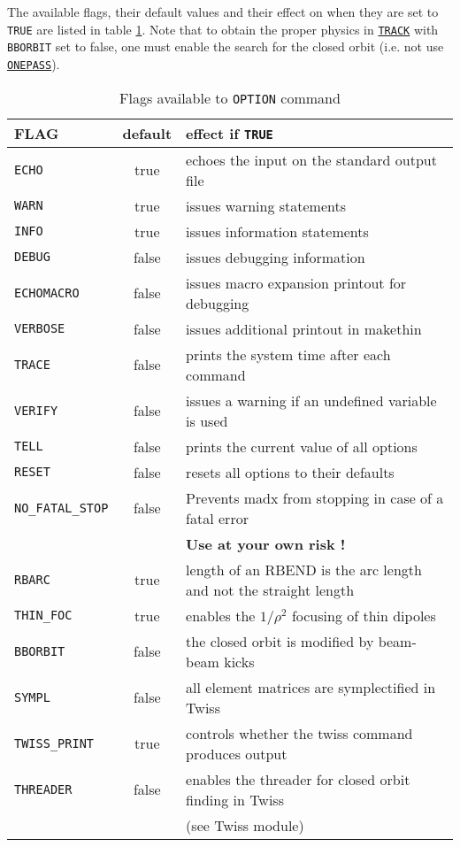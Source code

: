 The available flags, their default values and their effect on \madx when
they are set to \texttt{TRUE} are listed in table \ref{table:options}. Note that to obtain the proper physics in \hyperref[sec:track]{\texttt{TRACK}} with \texttt{BBORBIT} set to false, one must enable the search for the closed orbit (i.e. not use \hyperref[sec:track]{\texttt{ONEPASS}}).

\begin{table}[ht]
  \caption{Flags available to \texttt{OPTION} command}
  \vspace{1ex}
  \centering
  \label{table:options}
  \begin{tabular}{|l|c|l|}
    \hline
    \textbf{FLAG }  & \textbf{default} & \textbf{effect if \texttt{TRUE}} \\
    \hline
    \texttt{ECHO}      & true  & echoes the input on the standard output file \\
    \texttt{WARN}      & true  & issues warning statements\\
    \texttt{INFO}      & true  & issues information statements\\
    \texttt{DEBUG}     & false & issues debugging information \\
    \texttt{ECHOMACRO} & false & issues macro expansion printout for debugging \\
    \texttt{VERBOSE}   & false & issues additional printout in makethin \\
    \texttt{TRACE}     & false & prints the system time after each command \\
    \texttt{VERIFY}    & false & issues a warning if an undefined variable is used 
    \\
    \hline
    \texttt{TELL}      & false & prints the current value of all options \\
    \texttt{RESET}     & false & resets all options to their defaults \\
    \hline
    \texttt{NO\_FATAL\_STOP} & false & Prevents madx from stopping in case of a fatal error \\
    &       & \textbf{Use at your own risk !} \\
    \hline
    \texttt{RBARC}     & true & length of an RBEND is the arc length and not the straight length \\
    \texttt{THIN\_FOC} & true & enables the $1/\rho^2$ focusing of thin dipoles \\
    \texttt{BBORBIT}   & false & the closed orbit is modified by beam-beam kicks \\
    \texttt{SYMPL}     & false & all element matrices are symplectified in Twiss \\
    \texttt{TWISS\_PRINT} & true & controls whether the twiss command produces output \\
    \texttt{THREADER}  & false & enables the threader for closed orbit finding in Twiss \\ 
    &       & (see Twiss module) \\ 
    \hline
  \end{tabular}
\end{table}

